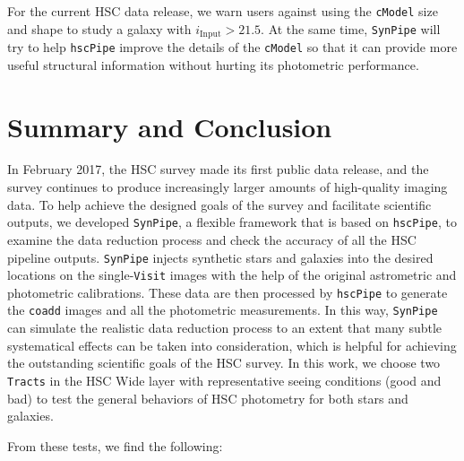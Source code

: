 \documentclass[useamsfonts]{pasj01}
\def\hscpipe{\texttt{hscPipe}}
\def\synpipe{\texttt{SynPipe}}
\def\cmodel{\texttt{cModel}}
\def\coadd{\texttt{coadd}}
\def\visit{\texttt{Visit}}
\def\tracts{\texttt{Tracts}}
\begin{document}
    For the current HSC data release, we warn users against using the \cmodel{} 
    size and shape to study a galaxy with $i_{\mathrm{Input}}>21.5$. 
    At the same time, \synpipe{} will try to help \hscpipe{} improve the details 
    of the \cmodel{} so that it can provide more useful structural information without hurting its photometric performance.  
    

\section{Summary and Conclusion}
    \label{sec:summary}

    In February 2017, the HSC survey made its first public data release, and the survey continues to
    produce increasingly larger amounts of high-quality imaging data.
    To help achieve the designed goals of the survey and facilitate scientific
    outputs, we developed \synpipe{}, a flexible framework that is based on 
    \hscpipe{}, to examine the data reduction process and check the accuracy of all the HSC pipeline outputs.
    \synpipe{} injects synthetic stars and galaxies into the desired locations on the
    single-\visit{} images with the help of the original astrometric and
    photometric calibrations.
    These data are then processed by \hscpipe{} to generate the \coadd{} images and
    all the photometric measurements.
    In this way, \synpipe{} can simulate the realistic data reduction process
    to an extent that many subtle systematical effects can be taken into
    consideration, which is helpful for achieving the outstanding scientific goals of the HSC
    survey.
    In this work, we choose two \tracts{} in the HSC Wide layer with
    representative seeing conditions (good and bad) to test the general behaviors of HSC
    photometry for both stars and galaxies.

    From these tests, we find the following:
\end{document}
